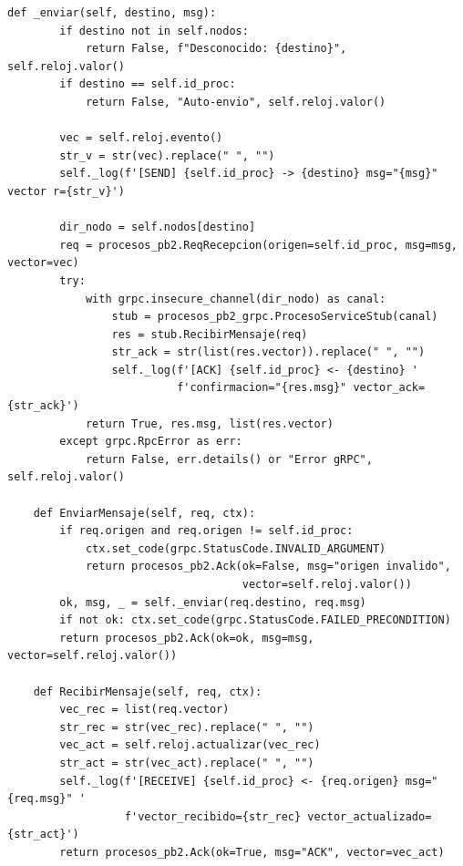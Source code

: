 \documentclass[letterpaper,11pt]{article}
\begin{document}
\begin{lstlisting}[style=python, caption={process.py — Envío y recepción de mensajes}]
    def _enviar(self, destino, msg):
        if destino not in self.nodos:
            return False, f"Desconocido: {destino}", self.reloj.valor()
        if destino == self.id_proc:
            return False, "Auto-envio", self.reloj.valor()
 
        vec = self.reloj.evento()
        str_v = str(vec).replace(" ", "")
        self._log(f'[SEND] {self.id_proc} -> {destino} msg="{msg}" vector r={str_v}')
 
        dir_nodo = self.nodos[destino]
        req = procesos_pb2.ReqRecepcion(origen=self.id_proc, msg=msg, vector=vec)
        try:
            with grpc.insecure_channel(dir_nodo) as canal:
                stub = procesos_pb2_grpc.ProcesoServiceStub(canal)
                res = stub.RecibirMensaje(req)
                str_ack = str(list(res.vector)).replace(" ", "")
                self._log(f'[ACK] {self.id_proc} <- {destino} '
                          f'confirmacion="{res.msg}" vector_ack={str_ack}')
            return True, res.msg, list(res.vector)
        except grpc.RpcError as err:
            return False, err.details() or "Error gRPC", self.reloj.valor()
 
    def EnviarMensaje(self, req, ctx):
        if req.origen and req.origen != self.id_proc:
            ctx.set_code(grpc.StatusCode.INVALID_ARGUMENT)
            return procesos_pb2.Ack(ok=False, msg="origen invalido",
                                    vector=self.reloj.valor())
        ok, msg, _ = self._enviar(req.destino, req.msg)
        if not ok: ctx.set_code(grpc.StatusCode.FAILED_PRECONDITION)
        return procesos_pb2.Ack(ok=ok, msg=msg, vector=self.reloj.valor())
 
    def RecibirMensaje(self, req, ctx):
        vec_rec = list(req.vector)
        str_rec = str(vec_rec).replace(" ", "")
        vec_act = self.reloj.actualizar(vec_rec)
        str_act = str(vec_act).replace(" ", "")
        self._log(f'[RECEIVE] {self.id_proc} <- {req.origen} msg="{req.msg}" '
                  f'vector_recibido={str_rec} vector_actualizado={str_act}')
        return procesos_pb2.Ack(ok=True, msg="ACK", vector=vec_act)
\end{lstlisting}
\end{document}
